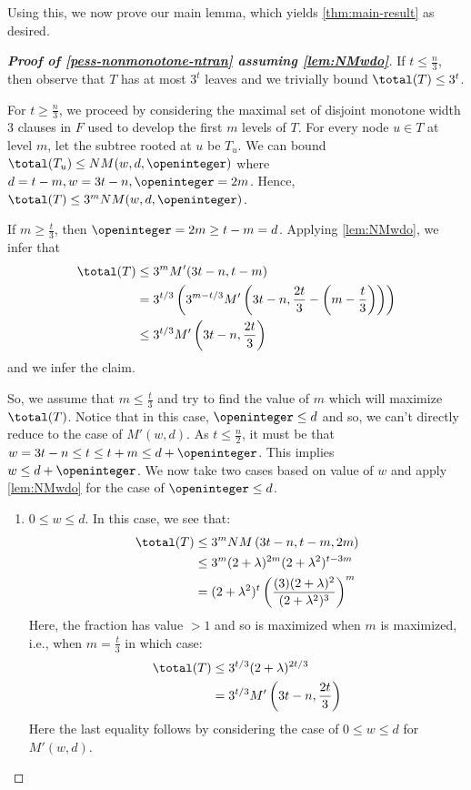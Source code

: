 Using this, we now prove our main lemma, which yields \cref{thm:main-result} as desired.

\begin{proof}[\textbf{Proof of \cref{pess-nonmonotone-ntran} assuming \cref{lem:NMwdo}}]
If $t \le \frac{n}{3}$, then observe that $T$ has at most $3^t$ leaves and we trivially bound $\total(T)\le 3^t$.

For $t \ge \frac{n}{3}$, we proceed by considering the maximal set of disjoint monotone width $3$ clauses in $F$ used to develop the first $m$ levels of $T$.
For every node $u\in T$ at level $m$, let the subtree rooted at $u$ be $T_u$.
We can bound $\total(T_u) \le NM(w, d, \openinteger)$ where $d = t-m, w = 3t-n, \openinteger = 2m$. Hence, $\total(T) \le 3^m NM(w, d, \openinteger)$.

If $m \ge \frac{t}{3}$, then $\openinteger = 2m \ge t - m = d$. Applying \cref{lem:NMwdo}, we infer that
\begin{align*}
\total(T) & \le 3^m M'(3t-n, t-m)\\
& = 3^{t/3} \left(3^{m-t/3} M'\left(3t-n, \frac{2t}{3} - \left(m - \frac{t}{3}\right) \right)\right)\\
& \le 3^{t/3} M'\left(3t-n, \frac{2t}{3}\right)\\
\end{align*}
and we infer the claim.

So, we assume that $m \le \frac{t}{3}$ and try to find the value of $m$ which will maximize $\total(T)$. Notice that in this case, $\openinteger \le d$ and so, we can't directly reduce to the case of $M'(w, d)$. 
As $t\le \frac{n}{2}$, it must be that $w = 3t-n \le t\le t+m \le d + \openinteger$.
This implies $w\le d+\openinteger$.
We now take two cases based on value of $w$ and apply \cref{lem:NMwdo} for the case of $\openinteger \le d$.

\begin{enumerate}[label=\textbf{Case \arabic*:}, itemindent=*, leftmargin=0em]

\item $0\le w\le d$.
In this case, we see that:
\begin{align*}
\total(T)   
   & \le 3^m NM\left(3t-n, t - m, 2m\right)\\
   & \le 3^m (2+\lambda)^{2m}(2+\lambda^2)^{t-3m}\\
   & = (2+\lambda^2)^t\left(\frac{(3)(2+\lambda)^2}{(2+\lambda^2)^3}\right)^m\\
\end{align*}
Here, the fraction has value $> 1$ and so is maximized when $m$ is maximized, i.e., when $m = \frac{t}{3}$ in which case:
\begin{align*}
\total(T)
& \le 3^{t/3} (2+\lambda)^{2t/3}\\
& = 3^{t/3} M'\left(3t-n, \frac{2t}{3}\right)
\end{align*}
Here the last equality follows by considering the case of $0\le w\le d$ for $M'(w, d)$.


\end{enumerate}
\end{proof}
